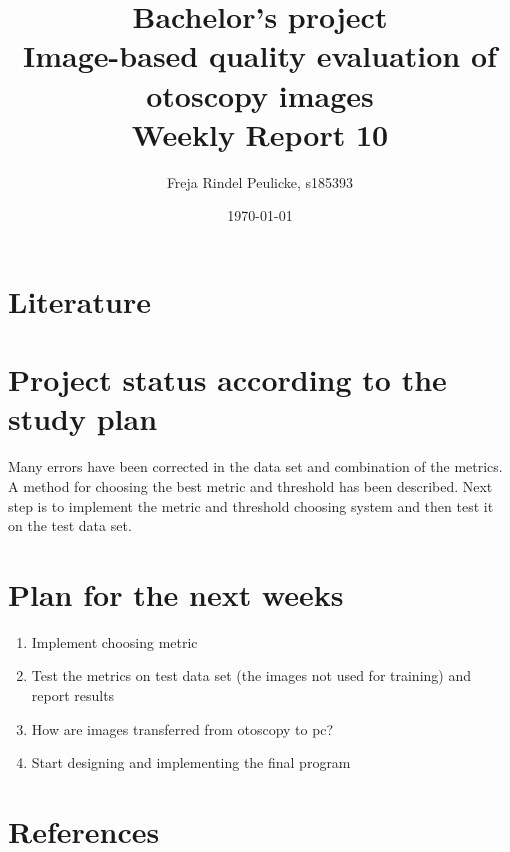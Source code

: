 \documentclass[10pt,a4paper]{article}
\title{{Bachelor's project\\[0.5em]}
       {\bf \huge Image-based quality evaluation of otoscopy images\\[0.5em]}
       {\bf Weekly Report 10}}
\author{Freja Rindel Peulicke, s185393}
\date{\today}
\begin{document}
\maketitle

\section*{Literature}




\newpage
\section*{Project status according to the study plan}
Many errors have been corrected in the data set and combination of the metrics. A method for choosing the best metric and threshold has been described. Next step is to implement the metric and threshold choosing system and then test it on the test data set.




\section*{Plan for the next weeks}

\begin{enumerate}
\item Implement choosing metric
\item Test the metrics on test data set (the images not used for training) and report results
\item How are images transferred from otoscopy to pc?
\item Start designing and implementing the final program
\end{enumerate}



\section*{References}
\printbibliography[type=online,title={Code downloads}]
\printbibliography[type=book,title={Books}]
\printbibliography[type=article,title={Articles}]
\end{document}
